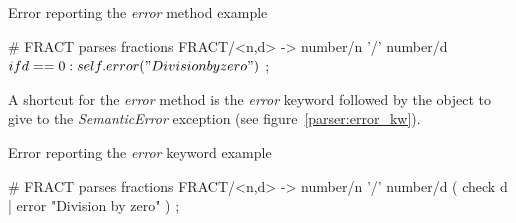 \begin{code}
\caption{Error reporting the \emph{error} method example}   \label{parser:error_method}
\begin{verbatimtab}[4]
    # FRACT parses fractions
    FRACT/<n,d> ->
        number/n '/' number/d
        $ if d==0: self.error("Division by zero") $
        ;
\end{verbatimtab}
\end{code}

A shortcut for the \emph{error} method is the \emph{error} keyword followed by the object to give to the \emph{SemanticError} exception (see figure~\ref{parser:error_kw}).

\begin{code}
\caption{Error reporting the \emph{error} keyword example}  \label{parser:error_kw}
\begin{verbatimtab}[4]
    # FRACT parses fractions
    FRACT/<n,d> ->
        number/n '/' number/d
        ( check d | error "Division by zero" )
        ;
\end{verbatimtab}
\end{code}

